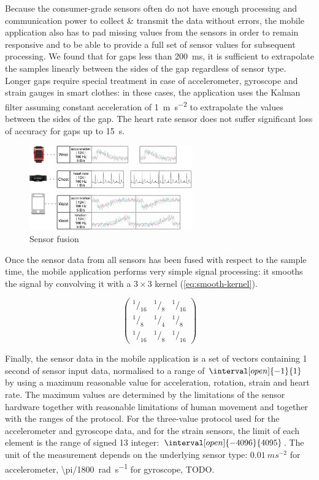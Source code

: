 Because the consumer-grade sensors often do not have enough processing and communication power to collect \& transmit the data without errors, the mobile application also has to pad missing values from the sensors in order to remain responsive and to be able to provide a full set of sensor values for subsequent processing. We found that for gaps less than \SI{200}{\milli\second}, it is sufficient to extrapolate the samples linearly between the sides of the gap regardless of sensor type. Longer gaps require special treatment in case of accelerometer, gyroscope and strain gauges in smart clothes: in these cases, the application uses the Kalman filter assuming constant acceleration of \SI{1}{\meter\second^{-2}} to extrapolate the values between the sides of the gap. The heart rate sensor does not suffer significant loss of accuracy for gaps up to \SI{15}{\second}.

\begin{figure}[hb]
	\begin{center}
		\caption{Sensor fusion}
		\label{fig:sensor-fusion}
		\includegraphics[width=7cm,keepaspectratio]{ri-sensor-fusion.png}
	\end{center}
\end{figure}

Once the sensor data from all sensors has been fused with respect to the sample time, the mobile application performs very simple signal processing: it smooths the signal by convolving it with a $3 \times 3$ kernel (\autoref{eq:smooth-kernel}).

\begin{equation} \label{eq:smooth-kernel}
	\begin{pmatrix}
	  ^1/_{16} & ^1/_8 & ^1/_{16} \\
	  ^1/_8    & ^1/_4 & ^1/_8    \\
	  ^1/_{16} & ^1/_8 & ^1/_{16}
	\end{pmatrix}
\end{equation}

Finally, the sensor data in the mobile application is a set of vectors containing 1 second of sensor input data, normalised to a range of $\interval[open]{-1}{1}$ by using a maximum reasonable value for acceleration, rotation, strain and heart rate. The maximum values are determined by the limitations of the sensor hardware together with reasonable limitations of human movement and together with the ranges of the protocol. For the three-value protocol used for the accelerometer and gyroscope data, and for the strain sensors, the limit of each element is the range of signed \SI{13}{\bit} integer: $\interval[open]{-4096}{4095}$. The unit of the measurement depends on the underlying sensor type: $0.01\ ms^{-2}$ for accelerometer, \SI{\pi/1800}{\radian\per\second} for gyroscope, TODO.

